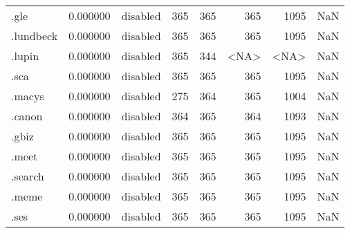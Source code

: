 \begin{tabular}{lrlrrrrl}
.gle                      &          0.000000 &        disabled &                         365 &                         365 &                         365 &                1095 &                  NaN \\
.lundbeck                 &          0.000000 &        disabled &                         365 &                         365 &                         365 &                1095 &                  NaN \\
.lupin                    &          0.000000 &        disabled &                         365 &                         344 &                        <NA> &                <NA> &                  NaN \\
.sca                      &          0.000000 &        disabled &                         365 &                         365 &                         365 &                1095 &                  NaN \\
.macys                    &          0.000000 &        disabled &                         275 &                         364 &                         365 &                1004 &                  NaN \\
.canon                    &          0.000000 &        disabled &                         364 &                         365 &                         364 &                1093 &                  NaN \\
.gbiz                     &          0.000000 &        disabled &                         365 &                         365 &                         365 &                1095 &                  NaN \\
.meet                     &          0.000000 &        disabled &                         365 &                         365 &                         365 &                1095 &                  NaN \\
.search                   &          0.000000 &        disabled &                         365 &                         365 &                         365 &                1095 &                  NaN \\
.meme                     &          0.000000 &        disabled &                         365 &                         365 &                         365 &                1095 &                  NaN \\
.ses                      &          0.000000 &        disabled &                         365 &                         365 &                         365 &                1095 &                  NaN \\

\end{tabular}
